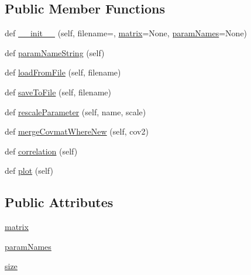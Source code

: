 \subsection*{Public Member Functions}
\begin{DoxyCompactItemize}
\item 
def \mbox{\hyperlink{classgetdist_1_1covmat_1_1CovMat_a3b43667e56d23152e5d8970bdd911623}{\+\_\+\+\_\+init\+\_\+\+\_\+}} (self, filename=\textquotesingle{}\textquotesingle{}, \mbox{\hyperlink{classgetdist_1_1covmat_1_1CovMat_abb601a3118265f1b3284e0c270f88ee6}{matrix}}=None, \mbox{\hyperlink{classgetdist_1_1covmat_1_1CovMat_aeb4d5170fe2277abd0d4a77e567caad2}{param\+Names}}=None)
\item 
def \mbox{\hyperlink{classgetdist_1_1covmat_1_1CovMat_a4565752dad2a96822320edb84eda5c09}{param\+Name\+String}} (self)
\item 
def \mbox{\hyperlink{classgetdist_1_1covmat_1_1CovMat_abfc622cd1affb70314b55774500ef495}{load\+From\+File}} (self, filename)
\item 
def \mbox{\hyperlink{classgetdist_1_1covmat_1_1CovMat_af22c0b0f5ef4374dc5b6e20d31f4bd4b}{save\+To\+File}} (self, filename)
\item 
def \mbox{\hyperlink{classgetdist_1_1covmat_1_1CovMat_a851295e6f66d18ab8392b0a4f33fb2bf}{rescale\+Parameter}} (self, name, scale)
\item 
def \mbox{\hyperlink{classgetdist_1_1covmat_1_1CovMat_ad2a276c4ce0e9aa059c9cb34790987e4}{merge\+Covmat\+Where\+New}} (self, cov2)
\item 
def \mbox{\hyperlink{classgetdist_1_1covmat_1_1CovMat_a17725849ae798508a7fa2847ecb06d8c}{correlation}} (self)
\item 
def \mbox{\hyperlink{classgetdist_1_1covmat_1_1CovMat_a5621f155a5025de50ea2a248811d5781}{plot}} (self)
\end{DoxyCompactItemize}
\subsection*{Public Attributes}
\begin{DoxyCompactItemize}
\item 
\mbox{\hyperlink{classgetdist_1_1covmat_1_1CovMat_abb601a3118265f1b3284e0c270f88ee6}{matrix}}
\item 
\mbox{\hyperlink{classgetdist_1_1covmat_1_1CovMat_aeb4d5170fe2277abd0d4a77e567caad2}{param\+Names}}
\item 
\mbox{\hyperlink{classgetdist_1_1covmat_1_1CovMat_a7af1ee8db220767ce81239a696f7b717}{size}}
\end{DoxyCompactItemize}


